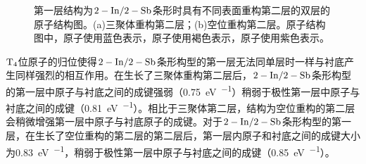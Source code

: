 \begin{figure}[htb]
    \caption{第一层结构为$\rm 2-In/2-Sb$条形时具有不同表面重构第二层的双层的原子结构图。(a)三聚体重构第二层；(b)空位重构第二层。原子结构图中，原子使用蓝色表示，原子使用褐色表示，原子使用紫色表示。}
    \label{fig:IS_structure_2Linsb_22strip}
\end{figure}

$\rm T_{4} \it$位原子的归位使得$\rm 2-In/2-Sb$条形构型的第一层无法同单层时一样与衬底产生同样强烈的相互作用。在生长了三聚体重构第二层后，$\rm 2-In/2-Sb$条形构型的第一层中原子与衬底之间的成键强弱（\SI{0.75}{\electronvolt\per\pair}）稍弱于极性第一层中原子与衬底之间的成键（\SI{0.81}{\electronvolt\per\pair}）。相比于三聚体第二层，结构为空位重构的第二层会稍微增强第一层中原子与衬底原子的成键。对于$\rm 2-In/2-Sb$条形构型的第一层，在生长了空位重构的第二层的第二层后，第一层内原子和衬底之间的成键大小为\SI{0.83}{\electronvolt\per\pair}，稍弱于极性第一层中原子与衬底之间的成键（\SI{0.85}{\electronvolt\per\pair}）。

